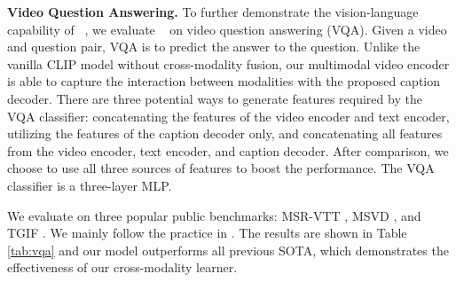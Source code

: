 \textbf{Video Question Answering.}
To further demonstrate the vision-language capability of \model~, we evaluate \model~ on video question answering (VQA). Given a video and question pair, VQA is to predict the answer to the question. Unlike the vanilla CLIP model without cross-modality fusion, our multimodal video encoder is able to capture the interaction between modalities with the proposed caption decoder. There are three potential ways to generate features required by the VQA classifier: concatenating the features of the video encoder and text encoder, utilizing the features of the caption decoder only, and concatenating all features from the video encoder, text encoder, and caption decoder. After comparison, we choose to use all three sources of features to boost the performance. The VQA classifier is a three-layer MLP.

We evaluate on three popular public benchmarks: MSR-VTT \cite{xu2016msr}, MSVD \cite{chen2011collecting}, and TGIF \cite{li2016tgif}. We mainly follow the practice in \cite{all_in_one}. The results are shown in Table \ref{tab:vqa} and our model outperforms all previous SOTA, which demonstrates the effectiveness of our cross-modality learner.